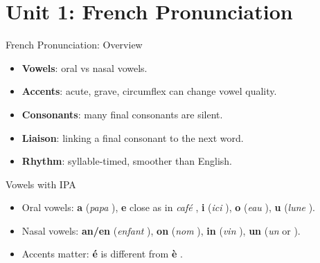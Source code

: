 \section{Unit 1: French Pronunciation}

\blueheader
\begin{frame}{French Pronunciation: Overview}
\begin{itemize}
  \item \textbf{Vowels}: oral vs nasal vowels.
  \item \textbf{Accents}: acute, grave, circumflex can change vowel quality.
  \item \textbf{Consonants}: many final consonants are silent.
  \item \textbf{Liaison}: linking a final consonant to the next word.
  \item \textbf{Rhythm}: syllable-timed, smoother than English.
\end{itemize}

\medskip
{}
\end{frame}

\redheader
\begin{frame}{Vowels with IPA}
\begin{itemize}
  \item Oral vowels: \textbf{a} (\textit{papa} \textipa{[papa]}), \textbf{e} close as in \textit{caf\'e} \textipa{[kafe]}, \textbf{i} (\textit{ici} \textipa{[isi]}), \textbf{o} (\textit{eau} \textipa{[o]}), \textbf{u} (\textit{lune} \textipa{[lyn]}).
  \item Nasal vowels: \textbf{an/en} \textipa{[A\~{}]} (\textit{enfant} \textipa{[A\~{}fA\~{}]}), \textbf{on} \textipa{[O\~{}]} (\textit{nom} \textipa{[nO\~{}]}), \textbf{in} \textipa{[E\~{}]} (\textit{vin} \textipa{[vE\~{}]}), \textbf{un} \textipa{[9\~{}]} (\textit{un} \textipa{[\~{}9]} or \textipa{[9\~{}]}).
  \item Accents matter: \textbf{\'e} \textipa{[e]} is different from \textbf{\`e} \textipa{[E]}.
\end{itemize}

\medskip
{}
\end{frame}

